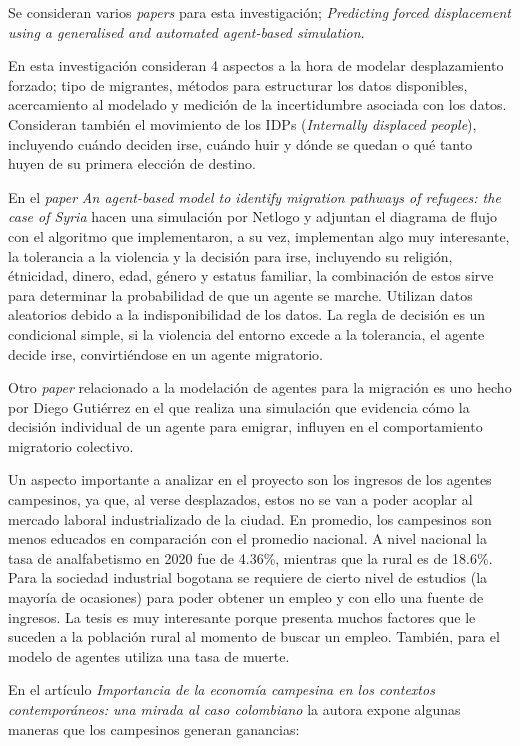 \documentclass[12pt]{article}
\begin{document}
Se consideran varios \textit{papers} para esta investigación; \textit{Predicting forced displacement using a generalised and automated agent-based simulation}\cite{suleimenova2020predicting}.


En esta investigación consideran 4 aspectos a la hora de modelar desplazamiento forzado; tipo de migrantes, métodos para estructurar los datos disponibles, acercamiento al modelado y medición de la incertidumbre asociada con los datos. Consideran también el movimiento de los IDPs (\textit{Internally displaced people}), incluyendo cuándo deciden irse, cuándo huir y dónde se quedan o qué tanto huyen de su primera elección de destino.

En el \textit{paper} \textit{An agent-based model to identify migration pathways of refugees: the case of Syria}\cite{hebert2017agent} hacen una simulación por Netlogo y adjuntan el diagrama de flujo con el algoritmo que implementaron, a su vez, implementan algo muy interesante, la tolerancia a la violencia y la decisión para irse, incluyendo su religión, étnicidad, dinero, edad, género y estatus familiar, la combinación de estos sirve para determinar la probabilidad de que un agente se marche. Utilizan datos aleatorios debido a la indisponibilidad de los datos. La regla de decisión es un condicional simple, si la violencia del entorno excede a la tolerancia, el agente decide irse, convirtiéndose en un agente migratorio.

Otro \textit{paper} relacionado a la modelación de agentes para la migración es uno hecho por Diego Gutiérrez\cite{Gutierrez2012} en el que realiza una simulación que evidencia cómo la decisión individual de un agente para emigrar, influyen en el comportamiento migratorio colectivo.

Un aspecto importante a analizar en el proyecto son los ingresos de los agentes campesinos, ya que, al verse desplazados, estos no se van a poder acoplar al mercado laboral industrializado de la ciudad. En promedio, los campesinos son menos educados en comparación con el promedio nacional. A nivel nacional la tasa de analfabetismo en 2020 fue de 4.36\%, mientras que la rural es de 18.6\%. Para la sociedad industrial bogotana se requiere de cierto nivel de estudios (la mayoría de ocasiones) para poder obtener un empleo y con ello una fuente de ingresos. La tesis es muy interesante porque presenta muchos factores que le suceden a la población rural al momento de buscar un empleo. También, para el modelo de agentes utiliza una tasa de muerte.

En el artículo \textit{Importancia de la economía campesina en los contextos contemporáneos: una mirada al caso colombiano}\cite{santacoloma2015importancia} la autora expone algunas maneras que los campesinos generan ganancias:
\end{document}
